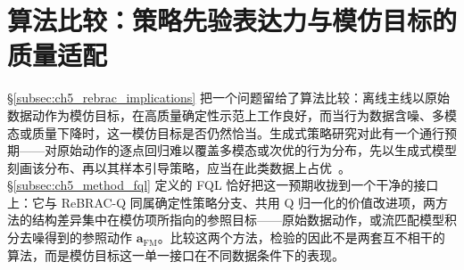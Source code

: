 
\section{算法比较：策略先验表达力与模仿目标的质量适配}\label{sec:ch5_algo_compare}

\S\ref{subsec:ch5_rebrac_implications} 把一个问题留给了算法比较：离线主线以原始数据动作为模仿目标，在高质量确定性示范上工作良好，而当行为数据含噪、多模态或质量下降时，这一模仿目标是否仍然恰当。生成式策略研究对此有一个通行预期——对原始动作的逐点回归难以覆盖多模态或次优的行为分布，先以生成式模型刻画该分布、再以其样本引导策略，应当在此类数据上占优~\citep{park2025fql}。\S\ref{subsec:ch5_method_fql} 定义的 FQL 恰好把这一预期收拢到一个干净的接口上：它与 ReBRAC-Q 同属确定性策略分支、共用 Q 归一化的价值改进项，两方法的结构差异集中在模仿项所指向的参照目标——原始数据动作，或流匹配模型积分去噪得到的参照动作 $\mathbf{a}_{\mathrm{FM}}$。比较这两个方法，检验的因此不是两套互不相干的算法，而是模仿目标这一单一接口在不同数据条件下的表现。

